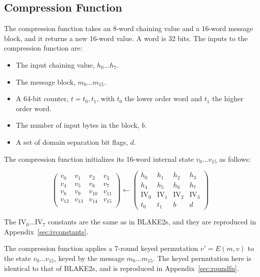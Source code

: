 \documentclass[11pt,notitlepage,a4paper]{article}
\newcommand{\IV}{\text{IV}}
\begin{document}
\subsection{Compression Function}\label{sec:compression}

The compression function takes an 8-word chaining value and a 16-word message
block, and it returns a new 16-word value. A word is 32 bits. The inputs to
the compression function are:

\begin{itemize}
    \item The input chaining value, $h_{0} \ldots h_{7}$.
    \item The message block, $m_{0} \ldots m_{15}$.
    \item A 64-bit counter, $t=t_{0},t_{1}$, with $t_{0}$ the lower order word
        and $t_{1}$ the higher order word.
    \item The number of input bytes in the block, $b$.
    \item A set of domain separation bit flags, $d$.
\end{itemize}

The compression function initializes its 16-word internal state $v_{0} \ldots
v_{15}$ as follows: 

\begin{equation*}
\begin{pmatrix}
v_{0} & v_{1} & v_{2} & v_{3} \\
v_{4} & v_{5} & v_{6} & v_{7} \\
v_{8} & v_{9} & v_{10} & v_{11} \\
v_{12} & v_{13} & v_{14} & v_{15} \\
\end{pmatrix}
\leftarrow
\begin{pmatrix}
h_{0} & h_{1} & h_{2} & h_{3} \\
h_{4} & h_{5} & h_{6} & h_{7} \\
\IV_{0} & \IV_{1} & \IV_{2} & \IV_{3} \\
t_{0} & t_{1} & b & d 
\end{pmatrix}
\end{equation*}

The $\IV_{0} \ldots \IV_{7}$ constants are the same as in
BLAKE2s, and they are reproduced in Appendix~\ref{sec:ivconstants}.

The compression function applies a 7-round keyed permutation $v' = E(m, v)$ to
the state $v_0 \dots v_{15}$, keyed by the message $m_0 \dots m_{15}$. The
keyed permutation here is identical to that of BLAKE2s, and is
reproduced in Appendix~\ref{sec:roundfn}.
\end{document}
